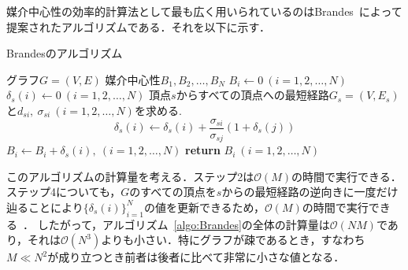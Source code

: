 媒介中心性の効率的計算法として最も広く用いられているのはBrandes~\cite{Brandes2001}によって提案されたアルゴリズムである．それを以下に示す．

\begin{algorithm}
  \caption{Brandesのアルゴリズム}
  \label{algo:Brandes}
  \begin{algorithmic}[1]
    \Require グラフ$G=(V,E)$
    \Ensure 媒介中心性$B_1,B_2,\ldots,B_N$
    \State $B_i\gets0\ (i=1,2,\ldots,N)$
    \State $\delta_s(i)\gets0\ (i=1,2,\ldots,N)$
    \State 頂点$s$からすべての頂点への最短経路$G_s=(V,E_s)$と$d_{si},\ \sigma_{si}\ (i=1,2,\ldots,N)$を求める. 
    \State \begin{equation*} \delta_s(i)\gets\delta_s(i)+\frac{\sigma_{si}}{\sigma_{sj}}(1+\delta_s(j)) \end{equation*}
    \EndFor
    \State $B_i\gets B_i+\delta_s(i),\ (i=1,2,\ldots,N)$
    \EndFor
    \State \textbf{return} $B_i\ (i=1,2,\ldots,N)$
  \end{algorithmic}
\end{algorithm}

このアルゴリズムの計算量を考える．ステップ2は$\mathcal{O}(M)$の時間で実行できる．
ステップ4についても，$G$のすべての頂点を$s$からの最短経路の逆向きに一度だけ辿ることにより$\{\delta_s(i)\}_{i=1}^N$の値を更新できるため，$\mathcal{O}(M)$の時間で実行できる~\cite{Brandes2001}．
したがって，アルゴリズム~\ref{algo:Brandes}の全体の計算量は$\mathcal{O}(NM)$であり，それは$\mathcal{O}(N^3)$よりも小さい．特にグラフが疎であるとき，すなわち$M \ll N^2$が成り立つとき前者は後者に比べて非常に小さな値となる．
